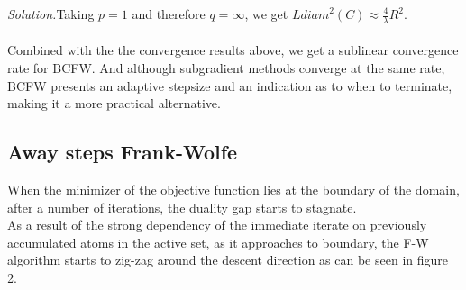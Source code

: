 \textit{Solution.}\quad Taking $p=1$ and therefore $q=\infty$, we get $L\textit{diam}^{2}(C)\approx \frac{4}{\lambda}R^{2}$.\\
\\
Combined with the the convergence results above, we get a sublinear convergence
rate for BCFW. And although subgradient methods converge at the same rate, BCFW
presents an adaptive stepsize and an indication as to when to terminate, making
it a more practical alternative.



\subsection{Away steps Frank-Wolfe}
When the minimizer of the objective function lies at the boundary of the domain,
after a number of iterations, the duality gap starts to stagnate.\\ As a result
of the strong dependency of the immediate iterate on previously accumulated
atoms in the active set, as it approaches to boundary, the F-W algorithm starts
to zig-zag around the descent direction as can be seen in figure 2.\\
\begin{algorithmic}
    \\
     \ENDFOR
\end{algorithmic}

